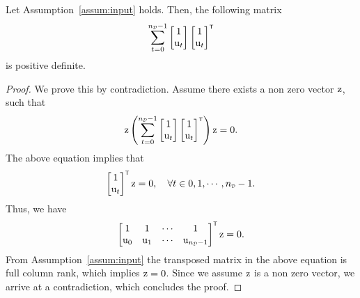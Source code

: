 \begin{lemma}\label{lem:PD for summarion u_t}
    Let Assumption~\ref{assum:input} holds. Then, the following matrix 
    \begin{equation}
        \sum_{t=0}^{\nD-1}
        \begin{bmatrix}
            1 \\ \vcu_t
        \end{bmatrix}
        \begin{bmatrix}
            1 \\ \vcu_t
        \end{bmatrix}^\tr
    \end{equation}
    is positive definite.
\end{lemma}
\begin{proof}
    We prove this by contradiction. Assume there exists a non zero vector ${ \mathrm{z} }$, such that
    \begin{equation}
        \vcz
        \left(
        \sum_{t=0}^{\nD-1}
        \begin{bmatrix}
            1 \\ \vcu_t
        \end{bmatrix}
        \begin{bmatrix}
            1 \\ \vcu_t
        \end{bmatrix}^\tr
        \right)
        \vcz = 0.
    \end{equation}
    The above equation implies that
    \begin{equation}
        \begin{bmatrix}
        1 \\ \vcu_t
        \end{bmatrix}^\tr
        \vcz = 0, \quad \forall t \in 0,1,\cdots,\nD-1.
    \end{equation}
    Thus, we have
    \begin{equation}
        \begin{bmatrix}
            1 & 1 & \cdots & 1\\
            \vcu_0 & \vcu_1 &\cdots & \vcu_{\nD-1}
        \end{bmatrix}^\tr
        \vcz = 0.
    \end{equation}
    From Assumption~\ref{assum:input} the transposed matrix in the above equation is full column rank, which implies ${ \mathrm{z} } = 0$. Since we assume ${ \mathrm{z} }$ is a non zero vector, we arrive at a contradiction, which concludes the proof.
\end{proof}

